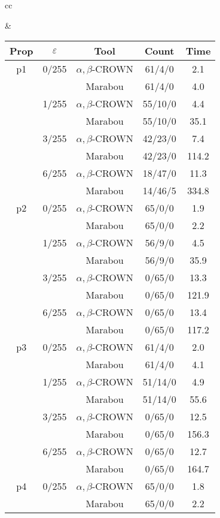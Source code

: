 \begin{table*}[htbp]
\begin{tabular}{cc}
\begin{minipage}{0.48\linewidth}
\end{minipage} &
\begin{minipage}{0.48\linewidth}
\setlength{\extrarowheight}{0pt}
\begin{tabular}{|c|c|c|c|c|}
\hline
Prop & $\varepsilon$ & Tool & Count & Time\\
\hline
p1 & 0/255 & $\alpha, \beta$-CROWN & 61/4/0 & 2.1 \\
 &  & Marabou & 61/4/0 & 4.0 \\
\cline{2-5}
 & 1/255 & $\alpha, \beta$-CROWN & 55/10/0 & 4.4 \\
 &  & Marabou & 55/10/0 & 35.1 \\
\cline{2-5}
 & 3/255 & $\alpha, \beta$-CROWN & 42/23/0 & 7.4 \\
 &  & Marabou & 42/23/0 & 114.2 \\
\cline{2-5}
 & 6/255 & $\alpha, \beta$-CROWN & 18/47/0 & 11.3 \\
 &  & Marabou & 14/46/5 & 334.8 \\
\cline{2-5}
\hline
p2 & 0/255 & $\alpha, \beta$-CROWN & 65/0/0 & 1.9 \\
 &  & Marabou & 65/0/0 & 2.2 \\
\cline{2-5}
 & 1/255 & $\alpha, \beta$-CROWN & 56/9/0 & 4.5 \\
 &  & Marabou & 56/9/0 & 35.9 \\
\cline{2-5}
 & 3/255 & $\alpha, \beta$-CROWN & 0/65/0 & 13.3 \\
 &  & Marabou & 0/65/0 & 121.9 \\
\cline{2-5}
 & 6/255 & $\alpha, \beta$-CROWN & 0/65/0 & 13.4 \\
 &  & Marabou & 0/65/0 & 117.2 \\
\cline{2-5}
\hline
p3 & 0/255 & $\alpha, \beta$-CROWN & 61/4/0 & 2.0 \\
 &  & Marabou & 61/4/0 & 4.1 \\
\cline{2-5}
 & 1/255 & $\alpha, \beta$-CROWN & 51/14/0 & 4.9 \\
 &  & Marabou & 51/14/0 & 55.6 \\
\cline{2-5}
 & 3/255 & $\alpha, \beta$-CROWN & 0/65/0 & 12.5 \\
 &  & Marabou & 0/65/0 & 156.3 \\
\cline{2-5}
 & 6/255 & $\alpha, \beta$-CROWN & 0/65/0 & 12.7 \\
 &  & Marabou & 0/65/0 & 164.7 \\
\cline{2-5}
\hline
p4 & 0/255 & $\alpha, \beta$-CROWN & 65/0/0 & 1.8 \\
 &  & Marabou & 65/0/0 & 2.2 \\

\end{tabular}
\end{minipage}
\end{tabular}
\end{table*}

